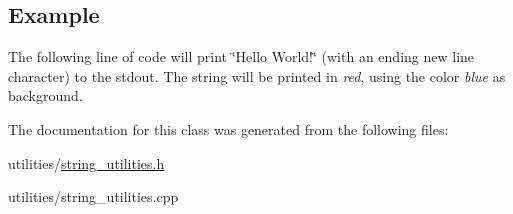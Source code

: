 \subsection*{Example}

The following line of code will print {\ttfamily \char`\"{}\+Hello World!\char`\"{}} (with an ending new line character) to the stdout. The string will be printed in {\itshape red}, using the color {\itshape blue} as background.


\begin{DoxyCode}{0}
\end{DoxyCode}
 

The documentation for this class was generated from the following files\+:\begin{DoxyCompactItemize}
\item 
utilities/\mbox{\hyperlink{string__utilities_8h}{string\+\_\+utilities.\+h}}\item 
utilities/string\+\_\+utilities.\+cpp\end{DoxyCompactItemize}
